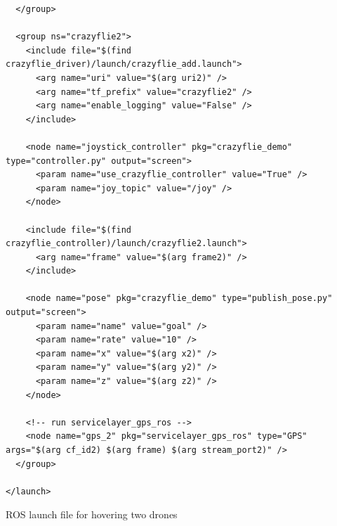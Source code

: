 \begin{code}
\begin{verbatim}
  </group>

  <group ns="crazyflie2">
    <include file="$(find crazyflie_driver)/launch/crazyflie_add.launch">
      <arg name="uri" value="$(arg uri2)" />
      <arg name="tf_prefix" value="crazyflie2" />
      <arg name="enable_logging" value="False" />
    </include>

    <node name="joystick_controller" pkg="crazyflie_demo" type="controller.py" output="screen">
      <param name="use_crazyflie_controller" value="True" />
      <param name="joy_topic" value="/joy" />
    </node>

    <include file="$(find crazyflie_controller)/launch/crazyflie2.launch">
      <arg name="frame" value="$(arg frame2)" />
    </include>

    <node name="pose" pkg="crazyflie_demo" type="publish_pose.py" output="screen">
      <param name="name" value="goal" />
      <param name="rate" value="10" />
      <param name="x" value="$(arg x2)" />
      <param name="y" value="$(arg y2)" />
      <param name="z" value="$(arg z2)" />
    </node>
    
    <!-- run servicelayer_gps_ros -->
    <node name="gps_2" pkg="servicelayer_gps_ros" type="GPS" args="$(arg cf_id2) $(arg frame) $(arg stream_port2)" />
  </group>
  
</launch>

\end{verbatim}
\caption{ROS launch file for hovering two drones\\}
\label{listing:xml_multi_hover}
\end{code}

